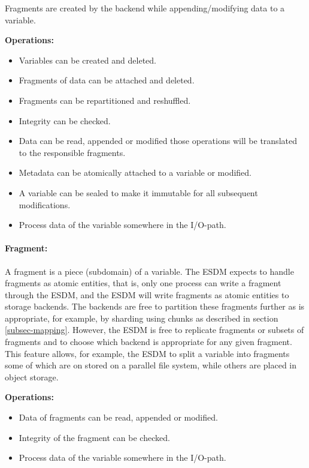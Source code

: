 Fragments are created by the backend while appending/modifying data to a variable.

\textbf{Operations:}
\begin{itemize}
	\item Variables can be created and deleted.
	\item Fragments of data can be attached and deleted.
	\item Fragments can be repartitioned and reshuffled.
	\item Integrity can be checked.
	\item Data can be read, appended or modified those operations will be translated to the responsible fragments.
	\item Metadata can be atomically attached to a variable or modified.
	\item A variable can be sealed to make it immutable for all subsequent modifications.
	\item Process data of the variable somewhere in the I/O-path.
\end{itemize}

\paragraph{Fragment:}  A fragment is a piece (subdomain) of a variable. The ESDM expects to handle fragments as atomic entities, that is, only one process can write a fragment through the ESDM, and the ESDM will write fragments as atomic entities to storage backends.
The backends are free to partition these fragments further as is appropriate, for example, by sharding using chunks as described in section \ref{subsec-mapping}.
However, the ESDM is free to replicate fragments or subsets of fragments and to choose which backend is appropriate for any given fragment.
This feature allows, for example, the ESDM to split a variable into fragments some of which are on stored on a parallel file system, while others are placed in object storage.

\textbf{Operations:}
\begin{itemize}
	\item Data of fragments can be read, appended or modified.
	\item Integrity of the fragment can be checked.
	\item Process data of the variable somewhere in the I/O-path.
\end{itemize}

